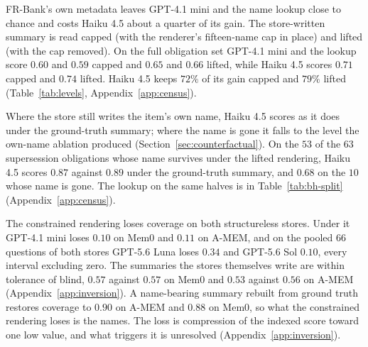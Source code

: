 \documentclass{article}
\begin{document}
FR-Bank's own metadata leaves GPT-4.1 mini and the name lookup close to chance and costs Haiku 4.5 about a quarter of its gain.
The store-written summary is read capped (with the renderer's fifteen-name cap in place) and lifted (with the cap removed).
On the full obligation set GPT-4.1 mini and the lookup score $0.60$ and $0.59$ capped and $0.65$ and $0.66$ lifted, while Haiku 4.5 scores $0.71$ capped and $0.74$ lifted.
Haiku 4.5 keeps $72\%$ of its gain capped and $79\%$ lifted (Table~\ref{tab:levels}, Appendix~\ref{app:census}).

Where the store still writes the item's own name, Haiku 4.5 scores as it does under the ground-truth summary; where the name is gone it falls to the level the own-name ablation produced (Section~\ref{sec:counterfactual}).
On the $53$ of the $63$ supersession obligations whose name survives under the lifted rendering, Haiku 4.5 scores $0.87$ against $0.89$ under the ground-truth summary, and $0.68$ on the $10$ whose name is gone. The lookup on the same halves is in Table~\ref{tab:bh-split} (Appendix~\ref{app:census}).

The constrained rendering loses coverage on both structureless stores.
Under it GPT-4.1 mini loses $0.10$ on Mem0 and $0.11$ on A-MEM, and on the pooled $66$ questions of both stores GPT-5.6 Luna loses $0.34$ and GPT-5.6 Sol $0.10$, every interval excluding zero.
The summaries the stores themselves write are within tolerance of blind, $0.57$ against $0.57$ on Mem0 and $0.53$ against $0.56$ on A-MEM (Appendix~\ref{app:inversion}).
A name-bearing summary rebuilt from ground truth restores coverage to $0.90$ on A-MEM and $0.88$ on Mem0, so what the constrained rendering loses is the names.
The loss is compression of the indexed score toward one low value, and what triggers it is unresolved (Appendix~\ref{app:inversion}).
\end{document}
